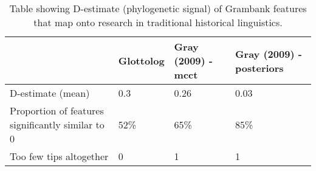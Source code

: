 \begin{table}[ht]
\centering
\begin{tabular}{p{6cm}p{2.2cm}p{2.2cm}p{2.2cm}}
  \hline
  & Glottolog & Gray (2009) - mcct & Gray (2009) - posteriors \\ 
  \hline
D-estimate (mean) & 0.3 & 0.26 & 0.03 \\ 
  Proportion of features significantly similar to 0 & 52\% & 65\% & 85\% \\ 
  Too few tips altogether & 0 & 1 & 1 \\ 
   \hline
\end{tabular}
\caption{Table showing D-estimate (phylogenetic signal) of Grambank features that map onto research in traditional historical linguistics.} 
\label{d_estimate_summary}
\end{table}
